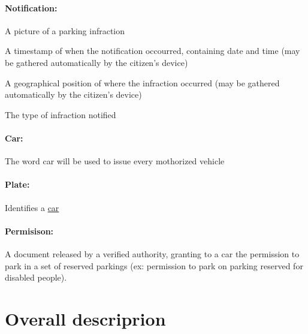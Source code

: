 \documentclass{article}
\begin{document}
		\paragraph{Notification:} 
			\begin{list}{-}{Represents a set of data submitted by any user composed by:}
				\item A picture of a parking infraction
				\item A timestamp of when the notification occourred, containing date and time (may be gathered automatically by the citizen's device)
				\item A geographical position of where the infraction occurred (may be gathered automatically by the citizen's device)
				\item The type of infraction notified
			\end{list}
		\paragraph{Car:}The word car will be used to issue every mothorized vehicle
		\paragraph{Plate:}Identifies a \underline{car}
		\paragraph{Permisison:}A document released by a verified authority, granting to a car the permission to park in a set of reserved parkings (ex: permission to park on parking reserved for disabled people). 
		

\newpage
\section{Overall descriprion}
\end{document}
